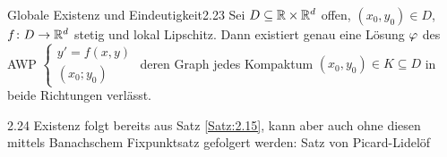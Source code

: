 \documentclass[a4paper]{article}
\begin{document}
\begin{Satz}{Globale Existenz und Eindeutigkeit}{2.23}
Sei $D\subseteq \mathbb R\times\mathbb R^d$ offen, $(x_0,y_0)\in D$, $f\colon D\to\mathbb R^d$ stetig und lokal Lipschitz. Dann existiert genau eine Lösung $\operatorname{\varphi}$ des AWP $\left\{\begin{array}{c}
y'=f(x,y)\\
(x_0;y_0)
\end{array}\right.$ deren Graph jedes Kompaktum $(x_0,y_0)\in K\subseteq D$ in beide Richtungen verlässt.
\end{Satz}

\begin{Bemerkung}{}{2.24}
Existenz folgt bereits aus Satz \ref{Satz:2.15}, kann aber auch ohne diesen mittels Banachschem Fixpunktsatz gefolgert werden: Satz von Picard-Lidelöf
\end{Bemerkung}
\end{document}
